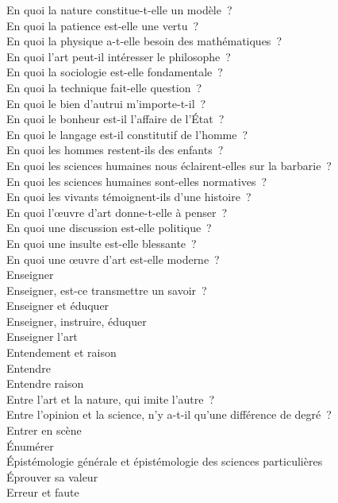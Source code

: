 \documentclass[a4paper,12pt]{article}
\begin{document}
En quoi la nature constitue-t-elle un modèle ? \\
En quoi la patience est-elle une vertu ? \\
En quoi la physique a-t-elle besoin des mathématiques ? \\
En quoi l'art peut-il intéresser le philosophe ? \\
En quoi la sociologie est-elle fondamentale ? \\
En quoi la technique fait-elle question ? \\
En quoi le bien d'autrui m'importe-t-il ? \\
En quoi le bonheur est-il l'affaire de l'État ? \\
En quoi le langage est-il constitutif de l'homme ? \\
En quoi les hommes restent-ils des enfants ? \\
En quoi les sciences humaines nous éclairent-elles sur la barbarie ? \\
En quoi les sciences humaines sont-elles normatives ? \\
En quoi les vivants témoignent-ils d'une histoire ? \\
En quoi l'œuvre d'art donne-t-elle à penser ? \\
En quoi une discussion est-elle politique ? \\
En quoi une insulte est-elle blessante ? \\
En quoi une œuvre d'art est-elle moderne ? \\
Enseigner \\
Enseigner, est-ce transmettre un savoir ? \\
Enseigner et éduquer \\
Enseigner, instruire, éduquer \\
Enseigner l'art \\
Entendement et raison \\
Entendre \\
Entendre raison \\
Entre l'art et la nature, qui imite l'autre ? \\
Entre l'opinion et la science, n'y a-t-il qu'une différence de degré ? \\
Entrer en scène \\
Énumérer \\
Épistémologie générale et épistémologie des sciences particulières \\
Éprouver sa valeur \\
Erreur et faute \\
\end{document}
